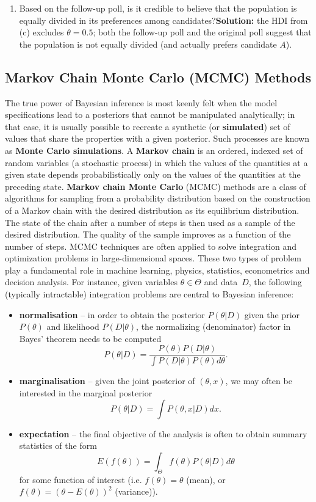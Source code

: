 \begin{Example}
\begin{enumerate}[noitemsep,label=(\alph*)]
 \item Based on the follow-up poll, is it credible to believe that the population is equally divided in its preferences among candidates?\newl\textbf{Solution:} the HDI from (c) excludes $\theta=0.5$; both the follow-up poll and the original poll suggest that the population is not equally divided (and actually prefers candidate $A$).
\end{enumerate}
\end{Example}
\subsection{Markov Chain Monte Carlo (MCMC) Methods}
The true power of Bayesian inference is most keenly felt when the model specifications lead to a posteriors that cannot be manipulated analytically; in that case, it is usually possible to recreate a synthetic (or \textbf{simulated}) set of values that share the properties with a given posterior. Such processes are known as \textbf{Monte Carlo simulations}.    
\newl A \textbf{Markov chain} is an ordered, indexed set of random variables (a stochastic process) in which the values of the quantities at a given state depends probabilistically only on the values of the quantities at the preceding state. \textbf{Markov chain Monte Carlo} (MCMC) methods are a class of algorithms for sampling from a probability distribution based on the construction of a Markov chain with the desired distribution as its equilibrium distribution.  The state of the chain after a number of steps is then used as a sample of the desired distribution. The quality of the sample improves as a function of the number of steps. \newl 
MCMC techniques are often applied to solve integration and optimization problems in large-dimensional spaces. These two types of problem play a fundamental role in machine learning, physics, statistics, econometrics and decision analysis. For instance, given variables $\theta\in\Theta$ and data~$D$, the following (typically intractable) integration problems are central to Bayesian inference:
\begin{itemize}
	\item \textbf{normalisation} -- in order to obtain the posterior $P(\theta | D)$ given the prior $P(\theta)$ and likelihood $P(D|\theta)$, the normalizing (denominator) factor in Bayes' theorem needs to be computed
	$$P( \theta | D ) = \frac{P(\theta)  P(D|\theta)}{\int P(D|\theta) P(\theta) d\theta}. $$

  \item \textbf{marginalisation} -- given the joint posterior of $(\theta,x)$, we may often be interested in the marginal posterior 
	$$ P(\theta|D) = \int P(\theta,x|D) dx.$$
	
	\item \textbf{expectation} -- the final objective of the analysis is often to obtain summary statistics of the form
	       $$ E(f(\theta)) = \int_{\Theta} f(\theta) P(\theta|D) d\theta $$
				for some function of interest (i.e. $f(\theta) =\theta$ (mean), or $f(\theta) = (\theta-E(\theta))^{2}$ (variance)). 
\end{itemize}

